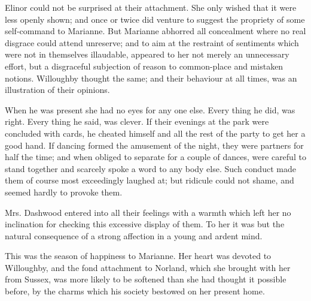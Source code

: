 Elinor could not be surprised at their attachment. She only wished that it were less openly shown; and once or twice did venture to suggest the propriety of some self-command to Marianne. But Marianne abhorred all concealment where no real disgrace could attend unreserve; and to aim at the restraint of sentiments which were not in themselves illaudable, appeared to her not merely an unnecessary effort, but a disgraceful subjection of reason to common-place and mistaken notions. Willoughby thought the same; and their behaviour at all times, was an illustration of their opinions.

When he was present she had no eyes for any one else. Every thing he did, was right. Every thing he said, was clever. If their evenings at the park were concluded with cards, he cheated himself and all the rest of the party to get her a good hand. If dancing formed the amusement of the night, they were partners for half the time; and when obliged to separate for a couple of dances, were careful to stand together and scarcely spoke a word to any body else. Such conduct made them of course most exceedingly laughed at; but ridicule could not shame, and seemed hardly to provoke them.

Mrs. Dashwood entered into all their feelings with a warmth which left her no inclination for checking this excessive display of them. To her it was but the natural consequence of a strong affection in a young and ardent mind.

This was the season of happiness to Marianne. Her heart was devoted to Willoughby, and the fond attachment to Norland, which she brought with her from Sussex, was more likely to be softened than she had thought it possible before, by the charms which his society bestowed on her present home.

